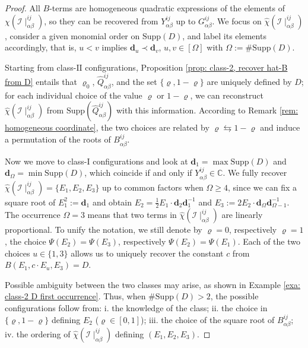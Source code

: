 \documentclass[10pt]{article}
\theoremstyle{remark}%
\theoremstyle{definition}%
\begin{document}
\begin{proof}
All $B$-terms are homogeneous quadratic expressions of the elements of $\mathfrak{\chi}(\mathcal{I}\mid_{\alpha\beta}^{ij})$, so they can be recovered from $Y_{\alpha\beta}^{ij}$ up to $G_{\alpha\beta}^{ij}$.
We focus on $\hat{\chi}(\mathcal{I}\mid_{\alpha\beta}^{ij})$, consider a given monomial order on $\mathrm{Supp}(D)$, and label its elements accordingly, that is, $u<v$ implies $\mathbf{d}_{u}\prec\mathbf{d}_{v}$,
$u,v\in[\Omega]$ with $\Omega:=\#\mathrm{Supp}(D)$. 

Starting from class-$\mathrm{II}$ configurations, Proposition \ref{prop: class-2, recover hat-B from D} entails that $\varrho_{0}$, $\hat{Q}_{\alpha\beta}^{ij}$, and the set $\{\varrho,1-\varrho\}$ are uniquely defined by $D$; for each individual choice of the value $\varrho$ or $1-\varrho$, we can reconstruct $\hat{\chi}(\mathcal{I}\mid_{\alpha\beta}^{ij})$ from $\mathrm{Supp}(\hat{Q}_{\alpha\beta}^{ij})$ with this information. 
According to Remark \ref{rem: homogeneous coordinate}, the two choices are related by $\varrho\leftrightarrows1-\varrho$ and induce a permutation of the roots of $B_{\alpha\beta}^{ij}$. 

Now we move to class-$\mathrm{I}$ configurations and look at $\mathbf{d}_{1}=\max\mathrm{Supp}(D)$ and $\mathbf{d}_{\Omega}=\min\mathrm{Supp}(D)$, which coincide if and only if $Y_{\alpha\beta}^{ij}\in\mathbb{C}$.
We fully recover $\hat{\chi}(\mathcal{I}\mid_{\alpha\beta}^{ij})=\{E_{1},E_{2},E_{3}\}$
up to common factors when $\Omega\geq4$, since we can fix a square root of $E_{1}^2:=\mathbf{d}_{1}$ and obtain $E_{2}=\frac{1}{2}E_{1}\cdot\mathbf{d}_{2}\mathbf{d}_{1}^{-1}$
and $E_{3}:=2E_{2}\cdot\mathbf{d}_{\Omega}\mathbf{d}_{\Omega-1}^{-1}$.
The occurrence $\Omega=3$ means that two terms in $\hat{\chi}(\mathcal{I}\mid_{\alpha\beta}^{ij})$ are linearly proportional. To unify the notation, we still denote by $\varrho=0$, respectively $\varrho=1$, the choice $\Psi(E_{2})=\Psi(E_{3})$, respectively $\Psi(E_{2})=\Psi(E_{1})$. Each of the two choices $u\in\{1,3\}$ allows us to uniquely recover the constant $c$ from $B(E_{1},c\cdot E_{u},E_{3})=D$. 

Possible ambiguity between the two classes may arise, as shown in Example
\ref{exa: class-2 D first occurrence}. Thus, when $\#\mathrm{Supp}(D)>2$, the possible configurations follow from: i. the knowledge of the class; ii. the choice in $\{\varrho,1-\varrho\}$ defining $E_{2}$ ($\varrho\in[0,1]$); iii. the choice of the square root of $B_{\alpha\beta}^{ij}$; iv. the ordering of $\hat{\chi}(\mathcal{I}\mid_{\alpha\beta}^{ij})$ defining $(E_{1},E_{2},E_{3})$. 


\end{proof}
\end{document}

